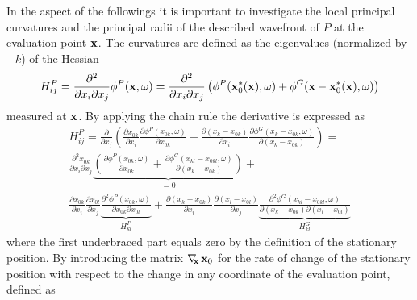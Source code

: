In the aspect of the followings it is important to investigate the local principal curvatures and the principal radii of the described wavefront of $P$ at the evaluation point $\mathbf{x}$. 
The curvatures are defined as the eigenvalues (normalized by $-k$) of the Hessian 
\begin{equation}
H_{ij}^P = \frac{\partial^2}{\partial x_{i} \partial x_{j}} \phi^P ( \mathbf{x},\omega) = \frac{\partial^2}{\partial x_{i} \partial x_{j}}\left( \phi^P(\mathbf{x}_0^*(\mathbf{x}),\omega) + \phi^G(\mathbf{x}-\mathbf{x}_0^*(\mathbf{x}),\omega) \right) 
\end{equation}
measured at $\mathbf{x}$.
By applying the chain rule the derivative is expressed as
\begin{multline}
H_{ij}^P 
= 
\frac{\partial}{\partial x_{j}} \left( \frac{\partial x_{0 k}}{\partial x_{i} } \frac{\partial \phi^P(x_{0 k},\omega)}{\partial x_{0 k} } + 
\frac{\partial ( x_k - x_{0 k}) }{\partial x_{i} }  \frac{\partial \phi^G(x_k-x_{0 k},\omega)}{\partial( x_k - x_{0 k}) }   \right) = \\
\frac{\partial^2 x_{0 k}}{\partial x_{i} \partial x_{j}} 
\underbrace{
\left( \frac{\partial \phi^P(x_{0 k},\omega)}{\partial x_{0 k} } 
+ \frac{\partial \phi^G(x_{kl}-x_{0 kl},\omega)}{\partial( x_k - x_{0 k}) } \right)}_{ = 0} +
\\ 
 \frac{\partial x_{0 k}}{\partial x_{i} } \frac{\partial x_{0 l}}{\partial x_{j}} 
\underbrace{ \frac{\partial^2 \phi^P(x_{0 k},\omega)}{\partial x_{0 k}\partial x_{0 l} }}_{H^P_{kl}}
+  \frac{\partial ( x_{k} - x_{0 k}) }{\partial x_{i} } 
 \frac{\partial ( x_{l} - x_{0 l}) }{\partial x_{j} }
\underbrace{ \frac{\partial^2 \phi^G(x_{kl}-x_{0 kl},\omega)}{\partial( x_k - x_{0 k}) \partial ( x_{l} - x_{0 l})} }_{H^G_{kl}} 
\end{multline}
where the first underbraced part equals zero by the definition of the stationary position.
By introducing the matrix $\nabla_{\!\!\mathbf{x}}\, \mathbf{x}_0$ for the rate of change of the stationary position with respect to the change in any coordinate of the evaluation point, defined as
